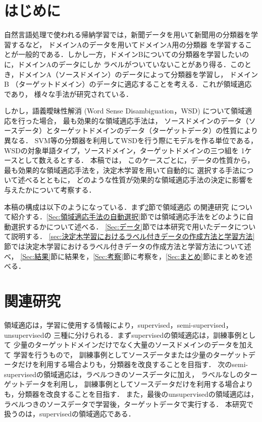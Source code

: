 \documentclass[japanese]{jnlp_1.4}
\begin{document}
\maketitle



\section{はじめに}

自然言語処理で使われる帰納学習では，新聞データを用いて新聞用の分類器を学習するなど，
ドメインAのデータを用いてドメインA用の分類器
を学習することが一般的である．しかし一方，ドメインBについての分類器を学習したいのに，ドメインAのデータにしか
ラベルがついていないことがあり得る．このとき，ドメインA（ソースドメイン）のデータによって分類器を学習し，
ドメインB （ターゲットドメイン）のデータに適応することを考える．これが領域適応であり，
様々な手法が研究されている．


しかし，語義曖昧性解消 (Word Sense Disambiguation，WSD) について領域適応を行った場合，
最も効果的な領域適応手法は，
ソースドメインのデータ（ソースデータ）とターゲットドメインのデータ（ターゲットデータ）の性質により
異なる．
SVM等の分類器を利用してWSDを行う際にモデルを作る単位である，
WSDの対象単語タイプ，ソースドメイン，ターゲットドメインの三つ組を
1ケースとして数えるとする．
本稿では，
このケースごとに，データの性質から，最も効果的な領域適応手法を，決定木学習を用いて自動的に
選択する手法について述べるとともに，
どのような性質が効果的な領域適応手法の決定に影響を与えたかについて考察する．


本稿の構成は以下のようになっている．まず\ref{Sec:関連研究}節で領域適応
の関連研究
について紹介する．\ref{Sec:領域適応手法の自動選択}節では領域適応手法をどのように自動選択するかについて述べる．
\ref{Sec:データ}節では本研究で用いたデータについて説明する．
\ref{sec:決定木学習におけるラベル付きデータの作成方法と学習方法}節では決定木学習におけるラベル付きデータの作成方法と学習方法について述べ，
\ref{Sec:結果}節に結果を，\ref{Sec:考察}節に考察を，\ref{Sec:まとめ}節にまとめを述べる．



\section{関連研究} \label{Sec:関連研究}

領域適応は，学習に使用する情報により，supervised，semi-supervised，unsupervisedの
三種に分けられる．まずsupervisedの領域適応は，訓練事例として
少量のターゲットドメインだけでなく大量のソースドメインのデータを加えて
学習を行うもので，
訓練事例としてソースデータまたは少量のターゲットデータだけを利用する場合よりも，分類器を改良することを目指す．
次のsemi-supervisedの領域適応は，ラベルつきのソースデータに加え，
ラベルなしのターゲットデータを利用し，
訓練事例としてソースデータだけを利用する場合よりも，分類器を改良することを目指す．
また，最後のunsupervisedの領域適応は，ラベルつきのソースデータで学習後，ターゲットデータで実行する．
本研究で扱うのは，supervisedの領域適応である．
\end{document}

